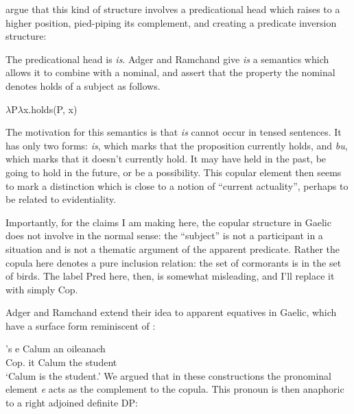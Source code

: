 \documentclass[output=paper]{langsci/langscibook}
\begin{document}
\citet{adger-ramchand:03} argue that this kind of structure involves a
predicational head which raises to a higher position, pied-piping its
complement, and creating a predicate inversion structure:

\ea \label{copularinversion}
\z

The predicational head is \emph{is}. Adger and Ramchand give \emph{is} a semantics which allows it to combine with a nominal, and assert that the property the nominal denotes holds of a subject as follows.

\ea $\lambda$P$\lambda$x.holds(P, x) \z

The motivation for this semantics is that \emph{is} cannot occur in tensed sentences. It has only two forms: \emph{is}, which marks that the proposition currently holds, and \emph{bu}, which marks that it doesn't currently hold. It may have held in the past, be going to hold in the future, or be a possibility. This copular element then seems to mark a distinction which
is close to a notion of ``current actuality'', perhaps to be related to evidentiality.

Importantly, for the claims I am making here, the copular structure in Gaelic
does not involve  in the normal sense: the ``subject'' is not a participant in a situation and is not a thematic argument of the apparent predicate. Rather the copula here denotes a pure inclusion relation: the set of cormorants is in the set of birds. The label Pred here, then, is somewhat misleading, and I'll replace it with simply Cop.

Adger and Ramchand extend their idea to apparent equatives in Gaelic, which have a surface
form reminiscent of :

\ea {}
\sn \gll  's e  Calum an oileanach\\
Cop.\Prs{} it Calum the student\\
\glt \enquote*{Calum is the student.}
\z
We argued that in these constructions the pronominal
element \emph{e} acts as the complement to the copula. This pronoun is then
anaphoric to a right adjoined definite DP:
\end{document}
